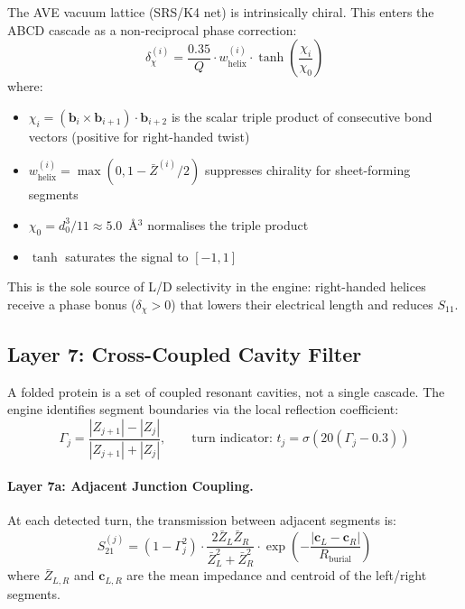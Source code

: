 The AVE vacuum lattice (SRS/K4 net) is intrinsically chiral.  This enters the ABCD cascade as a non-reciprocal phase correction:
\begin{equation}
    \delta_\chi^{(i)} = \frac{0.35}{Q} \cdot w_\text{helix}^{(i)} \cdot \tanh\!\left(\frac{\chi_i}{\chi_0}\right)
    \label{eq:chiral_phase}
\end{equation}
where:
\begin{itemize}
    \item $\chi_i = (\mathbf{b}_{i} \times \mathbf{b}_{i+1}) \cdot \mathbf{b}_{i+2}$ is the scalar triple product of consecutive bond vectors (positive for right-handed twist)
    \item $w_\text{helix}^{(i)} = \max(0, 1 - \bar{Z}^{(i)}/2)$ suppresses chirality for sheet-forming segments
    \item $\chi_0 = d_0^3 / 11 \approx 5.0$~\AA$^3$ normalises the triple product
    \item $\tanh$ saturates the signal to $[-1, 1]$
\end{itemize}

This is the sole source of L/D selectivity in the engine: right-handed helices receive a phase bonus ($\delta_\chi > 0$) that lowers their electrical length and reduces $S_{11}$.

\subsection{Layer 7: Cross-Coupled Cavity Filter}

A folded protein is a set of coupled resonant cavities, not a single cascade.  The engine identifies segment boundaries via the local reflection coefficient:
\begin{equation}
    \Gamma_j = \frac{|Z_{j+1}| - |Z_j|}{|Z_{j+1}| + |Z_j|}, \qquad \text{turn indicator: } t_j = \sigma(20(\Gamma_j - 0.3))
    \label{eq:gamma_turn}
\end{equation}

\paragraph{Layer 7a: Adjacent Junction Coupling.}
At each detected turn, the transmission between adjacent segments is:
\begin{equation}
    S_{21}^{(j)} = (1 - \Gamma_j^2) \cdot \frac{2\bar{Z}_L \bar{Z}_R}{\bar{Z}_L^2 + \bar{Z}_R^2} \cdot \exp\!\left(-\frac{|\mathbf{c}_L - \mathbf{c}_R|}{R_\text{burial}}\right)
    \label{eq:junction_s21}
\end{equation}
where $\bar{Z}_{L,R}$ and $\mathbf{c}_{L,R}$ are the mean impedance and centroid of the left/right segments.

